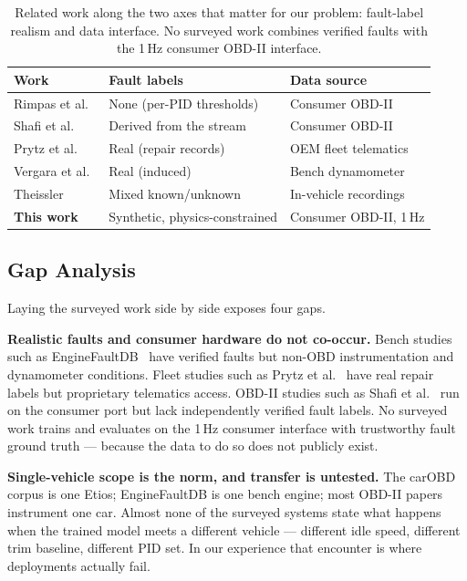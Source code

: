 \begin{table}[H]
  \centering
  \caption{Related work along the two axes that matter for our problem:
    fault-label realism and data interface. No surveyed work combines
    verified faults with the 1\,Hz consumer OBD-II interface.}
  \label{tab:relwork}
  \begin{tabular}{lll}
    \toprule
    Work & Fault labels & Data source\\
    \midrule
    Rimpas et al.~\cite{rimpas2020} & None (per-PID thresholds) & Consumer OBD-II\\
    Shafi et al.~\cite{shafi2018} & Derived from the stream & Consumer OBD-II\\
    Prytz et al.~\cite{prytz2015} & Real (repair records) & OEM fleet telematics\\
    Vergara et al.~\cite{vergara2023} & Real (induced) & Bench dynamometer\\
    Theissler~\cite{theissler2017} & Mixed known/unknown & In-vehicle recordings\\
    \textbf{This work} & Synthetic, physics-constrained & Consumer OBD-II, 1\,Hz\\
    \bottomrule
  \end{tabular}
\end{table}

\subsection{Gap Analysis}

Laying the surveyed work side by side exposes four gaps.

\textbf{Realistic faults and consumer hardware do not co-occur.} Bench
studies such as EngineFaultDB~\cite{vergara2023} have verified faults but
non-OBD instrumentation and dynamometer conditions. Fleet studies such as
Prytz et al.~\cite{prytz2015} have real repair labels but proprietary
telematics access. OBD-II studies such as Shafi et al.~\cite{shafi2018}
run on the consumer port but lack independently verified fault labels.
No surveyed work trains and evaluates on the 1\,Hz consumer interface with
trustworthy fault ground truth --- because the data to do so does not
publicly exist.

\textbf{Single-vehicle scope is the norm, and transfer is untested.} The
carOBD corpus is one Etios; EngineFaultDB is one bench engine; most OBD-II
papers instrument one car. Almost none of the surveyed systems state what
happens when the trained model meets a different vehicle --- different
idle speed, different trim baseline, different PID set. In our experience
that encounter is where deployments actually fail.

